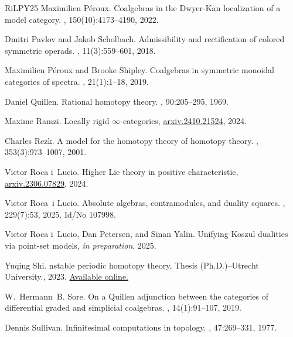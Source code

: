 \documentclass{proc-l}
\theoremstyle{plain}
\theoremstyle{definition}
\theoremstyle{remark}
\begin{document}
\begin{thebibliography}{RiLPY25}
Maximilien P{\'e}roux.
\newblock Coalgebras in the {Dwyer}-{Kan} localization of a model category.
, 150(10):4173--4190, 2022.

Dmitri Pavlov and Jakob Scholbach.
\newblock Admissibility and rectification of colored symmetric operads.
, 11(3):559--601, 2018.

Maximilien P{\'e}roux and Brooke Shipley.
\newblock Coalgebras in symmetric monoidal categories of spectra.
, 21(1):1--18, 2019.

Daniel Quillen.
\newblock Rational homotopy theory.
, 90:205--295, 1969.

Maxime Ramzi.
\newblock Locally rigid $\infty$-categories,
  \href{https://arxiv.org/abs/2410.21524}{arxiv.2410.21524}, 2024.

Charles Rezk.
\newblock A model for the homotopy theory of homotopy theory.
, 353(3):973--1007, 2001.

Victor {R}oca {i}~{L}ucio.
\newblock Higher {L}ie theory in positive characteristic,
  \href{https://arxiv.org/abs/2306.07829}{arxiv.2306.07829}, 2024.

Victor Roca~i Lucio.
\newblock Absolute algebras, contramodules, and duality squares.
, 229(7):53, 2025.
\newblock Id/No 107998.

Victor {R}oca {i}~{L}ucio, Dan Petersen, and Sinan Yalin.
\newblock Unifying {K}oszul dualities via point-set models, \textit{in
  preparation}, 2025.

Yuqing Shi.
nstable {p}eriodic {h}omotopy {t}heory, {T}hesis
  ({P}h.{D}.)--{U}trecht {U}niversity., 2023.
\newblock
  \href{https://dspace.library.uu.nl/bitstream/handle/1874/431446/shi%20-%20thesisonlineubu%20-%20650bf9a776efd.pdf?sequence=1&isAllowed=y}{Available
  online.}

W.~Hermann~B. Sore.
\newblock On a {Q}uillen adjunction between the categories of differential
  graded and simplicial coalgebras.
, 14(1):91--107, 2019.

Dennis Sullivan.
\newblock Infinitesimal computations in topology.
, 47:269--331, 1977.
\end{thebibliography}
\end{document}
